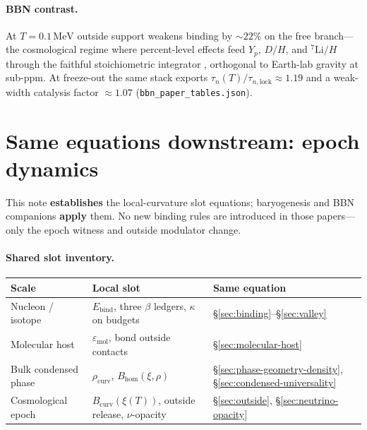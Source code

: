 \documentclass[11pt,notitlepage]{amsart}
\begin{document}
\paragraph{BBN contrast.}
At $T=0.1\,\mathrm{MeV}$ outside support weakens binding by $\sim 22\%$ on the free
branch---the cosmological regime where percent-level effects feed $Y_p$, $D/H$, and
$^7\mathrm{Li}/H$ through the faithful stoichiometric integrator
\cite{hqiv-bbn-paper}, orthogonal to Earth-lab gravity at sub-ppm. At freeze-out the
same stack exports $\tau_n(T)/\tau_{n,\mathrm{lock}}\approx 1.19$ and a weak-width
catalysis factor $\approx 1.07$ (\texttt{bbn\_paper\_tables.json}).

\section{Same equations downstream: epoch dynamics}
\label{sec:downstream}

This note \textbf{establishes} the local-curvature slot equations; baryogenesis and
BBN companions \textbf{apply} them. No new binding rules are introduced in those
papers---only the epoch witness and outside modulator change.

\paragraph{Shared slot inventory.}
\begin{center}
\small
\begin{tabular}{@{}lll@{}}
\toprule
Scale & Local slot & Same equation \\
\midrule
Nucleon / isotope & $E_{\mathrm{bind}}$, three $\beta$ ledgers, $\kappa$ on budgets &
  \S\ref{sec:binding}--\S\ref{sec:valley} \\
Molecular host & $\varepsilon_{\mathrm{mol}}$, bond outside contacts &
  \S\ref{sec:molecular-host} \\
Bulk condensed phase & $\rho_{\mathrm{curv}}$, $B_{\mathrm{hom}}(\xi,\rho)$ &
  \S\ref{sec:phase-geometry-density}, \S\ref{sec:condensed-universality} \\
Cosmological epoch & $B_{\mathrm{curv}}(\xi(T))$, outside release, $\nu$-opacity &
  \S\ref{sec:outside}, \S\ref{sec:neutrino-opacity} \\
\bottomrule
\end{tabular}
\end{center}
\end{document}
